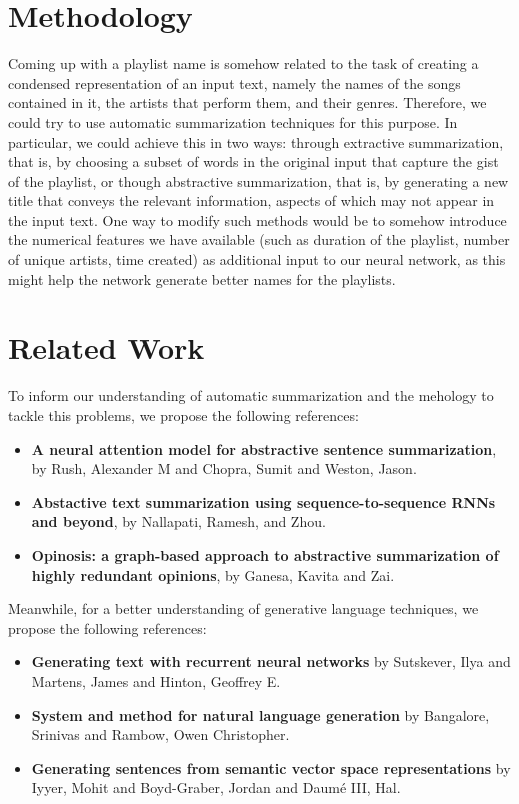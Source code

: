 \documentclass{article} %
\begin{document}
\section{Methodology}
\label{methods}
Coming up with a playlist name is somehow related to the task of creating a condensed representation of an input text, namely the names of the songs contained in it, the artists that perform them, and their genres.
Therefore, we could try to use automatic summarization techniques for this purpose. In particular, we could achieve this in two ways: through extractive summarization, that is, by choosing a subset of words in the original input that capture the gist of the playlist, or though abstractive summarization, that is, by generating a new title that conveys the relevant information, aspects of which may not appear in the input text.  
One way to modify such methods would be to somehow introduce the numerical features we have available (such as duration of the playlist, number of unique artists, time created) as additional input to our neural network, as this might help the network generate better names for the playlists.

\section{Related Work}
\label{work}
To inform our understanding of automatic summarization and the mehology to tackle this problems, we propose the following references:
\begin{itemize}
	\item \textbf{A neural attention model for abstractive sentence summarization}\cite{rush2015neural}, by Rush, Alexander M and Chopra, Sumit and Weston, Jason.
	\item \textbf{Abstactive text summarization using sequence-to-sequence RNNs and beyond}\cite{nallapati2016abstractive}, by Nallapati, Ramesh, and Zhou.
	\item \textbf{Opinosis: a graph-based approach to abstractive summarization of highly redundant opinions}\cite{ganesan2010opinosis}, by Ganesa, Kavita and Zai. 
\end{itemize}

Meanwhile, for a better understanding of generative language techniques, we propose the following references: 
\begin{itemize}
    \item \textbf{Generating text with recurrent neural networks}\cite{sutskever2011generating} by Sutskever, Ilya and Martens, James and Hinton, Geoffrey E.	
    \item \textbf{System and method for natural language generation}\cite{bangalore2007system} by Bangalore, Srinivas and Rambow, Owen Christopher. 
    \item \textbf{Generating sentences from semantic vector space representations}\cite{iyyer2014generating} by Iyyer, Mohit and Boyd-Graber, Jordan and Daum{\'e} III, Hal. 
\end{itemize}
\end{document}
